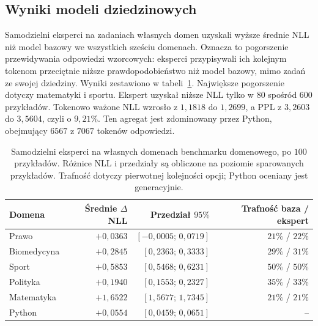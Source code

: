 \subsection{Wyniki modeli dziedzinowych}
\label{subsec:wyniki_ekspertow}
Samodzielni eksperci na zadaniach własnych domen uzyskali wyższe średnie NLL niż model bazowy we wszystkich sześciu domenach. Oznacza to pogorszenie przewidywania odpowiedzi wzorcowych: eksperci przypisywali ich kolejnym tokenom przeciętnie niższe prawdopodobieństwo niż model bazowy, mimo zadań ze swojej dziedziny. Wyniki zestawiono w tabeli~\ref{tab:eksperci_jakosc}. Największe pogorszenie dotyczy matematyki i sportu. Ekspert uzyskał niższe NLL tylko w $80$ spośród $600$ przykładów. Tokenowo ważone NLL wzrosło z $1{,}1818$ do $1{,}2699$, a PPL z $3{,}2603$ do $3{,}5604$, czyli o $9{,}21\%$. Ten agregat jest zdominowany przez Python, obejmujący $6567$ z $7067$ tokenów odpowiedzi.

\begin{table}[htbp]
\centering
\small
\begin{tabular}{lrrr}
\toprule
Domena & Średnie $\Delta$ NLL & Przedział $95\%$ & Trafność baza / ekspert \\
\midrule
Prawo & $+0{,}0363$ & $[-0{,}0005;\,0{,}0719]$ & $21\%$ / $22\%$ \\
Biomedycyna & $+0{,}2845$ & $[0{,}2363;\,0{,}3333]$ & $29\%$ / $31\%$ \\
Sport & $+0{,}5853$ & $[0{,}5468;\,0{,}6231]$ & $50\%$ / $50\%$ \\
Polityka & $+0{,}1940$ & $[0{,}1553;\,0{,}2327]$ & $35\%$ / $33\%$ \\
Matematyka & $+1{,}6522$ & $[1{,}5677;\,1{,}7345]$ & $21\%$ / $21\%$ \\
Python & $+0{,}0554$ & $[0{,}0459;\,0{,}0651]$ & -- \\
\bottomrule
\end{tabular}
\caption{Samodzielni eksperci na własnych domenach benchmarku domenowego, po $100$ przykładów. Różnice NLL i przedziały są obliczone na poziomie sparowanych przykładów. Trafność dotyczy pierwotnej kolejności opcji; Python oceniany jest generacyjnie.}
\label{tab:eksperci_jakosc}
\end{table}

